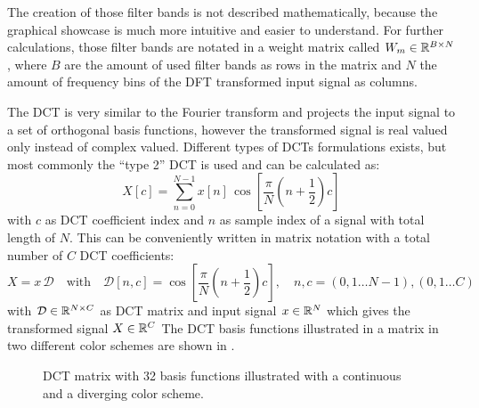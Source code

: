 \FloatBarrier
\noindent
The creation of those filter bands is not described mathematically, because the graphical showcase is much more intuitive and easier to understand.
For further calculations, those filter bands are notated in a weight matrix called $W_m \in \mathbb{R}^{B \times N}$, where $B$ are the amount of used filter bands as rows in the matrix and $N$ the amount of frequency bins of the DFT transformed input signal as columns.

The DCT is very similar to the Fourier transform and projects the input signal to a set of orthogonal basis functions, however the transformed signal is real valued only instead of complex valued.
Different types of DCTs formulations exists, but most commonly the \enquote{type 2} DCT is used and can be calculated as:
\begin{equation}\label{eq:signal_mfcc_dct}
  X[c] = \sum_{n=0}^{N-1} x[n] \, \cos{\left[ \frac{\pi}{N} \left( n + \frac{1}{2} \right) c \right]}
\end{equation}
with $c$ as DCT coefficient index and $n$ as sample index of a signal with total length of $N$.
This can be conveniently written in matrix notation with a total number of $C$ DCT coefficients:
\begin{equation}\label{eq:signal_mfcc_dct_matrix}
  X =  x \, \mathcal{D} \quad \mathrm{with} \quad \mathcal{D}[n, c] = \cos{\left[ \frac{\pi}{N} \left( n + \frac{1}{2} \right) c  \right]}, 
  \quad n, c = (0, 1 \dots N - 1), (0, 1 \dots C) 
\end{equation}
with $\mathcal{D} \in \mathbb{R}^{N \times C}$ as DCT matrix and input signal $x \in \mathbb{R}^N$ which gives the transformed signal $X \in \mathbb{R}^C$
The DCT basis functions illustrated in a matrix in two different color schemes are shown in .
\begin{figure}[!ht]
  \centering
  \quad
  \caption{DCT matrix with 32 basis functions illustrated with a continuous and a diverging color scheme.}
  \label{fig:signal_mfcc_dct}
\end{figure}
